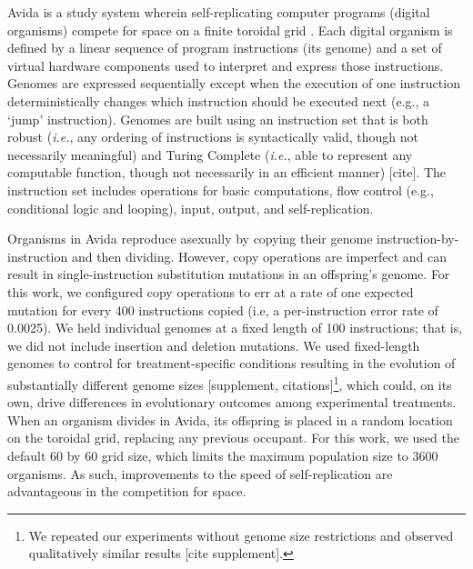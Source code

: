 Avida is a study system wherein self-replicating computer programs (digital organisms) compete for space on a finite toroidal grid \citep{ofria_avida:_2009}.
Each digital organism is defined by a linear sequence of program instructions (its genome) and a set of virtual hardware components used to interpret and express those instructions. 
Genomes are expressed sequentially except when the execution of one instruction deterministically changes which instruction should be executed next (e.g., a `jump' instruction). 
Genomes are built using an instruction set that is both robust (\textit{i.e.}, any ordering of instructions is syntactically valid, though not necessarily meaningful) and Turing Complete (\textit{i.e.}, able to represent any computable function, though not necessarily in an efficient manner) [cite].
The instruction set includes operations for basic computations, flow control (e.g., conditional logic and looping), input, output, and self-replication.

% 

Organisms in Avida reproduce asexually by copying their genome instruction-by-instruction and then dividing. 
However, copy operations are imperfect and can result in single-instruction substitution mutations in an offspring's genome. 
For this work, we configured copy operations to err at a rate of one expected mutation for every 400 instructions copied (i.e, a per-instruction error rate of 0.0025).
We held individual genomes at a fixed length of 100 instructions; that is, we did not include insertion and deletion mutations. 
We used fixed-length genomes to control for treatment-specific conditions resulting in the evolution of substantially different genome sizes [supplement, citations]\footnote{We repeated our experiments without genome size restrictions and observed qualitatively similar results [cite supplement].}, which could, on its own, drive differences in evolutionary outcomes among experimental treatments.
When an organism divides in Avida, its offspring is placed in a random location on the toroidal grid, replacing any previous occupant.
For this work, we used the default 60 by 60 grid size, which limits the maximum population size to 3600 organisms.
As such, improvements to the speed of self-replication are advantageous in the competition for space.

